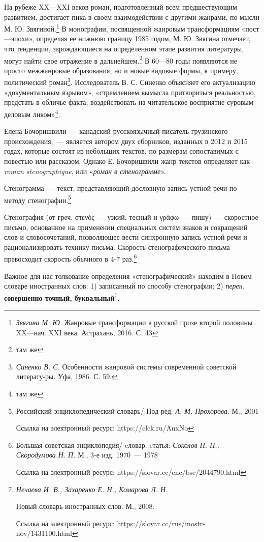 \documentclass{kursa4}
\begin{document}
    На рубеже XX—XXI веков роман, подготовленный всем предшествующим развитием, достигает пика в своем взаимодействии с другими жанрами, по мысли М. Ю. Звягиной.\footnote{\textit{Звягина М. Ю.} Жанровые трансформации в русской прозе второй половины XX—нач. XXI века. Астрахань, 2016. С. 43} 
    В монографии, посвященной жанровым трансформациям «пост—эпохи», определяя ее нижнюю границу 1985 годом, М. Ю. Звягина отмечает, что тенденции, зарождающиеся на определенном этапе развития литературы, могут найти свое отражение в дальнейшем.\footnote{там же}  В 60—80 годы появляются не просто межжанровые образования, но и новые видовые формы, к примеру, политический роман\footnote{\textit{Синенко В. С.} Особенности жанровой системы современной советской литерату-ры. Уфа, 1986.  С. 59.}. Исследователь В. С. Синенко объясняет его актуализацию «документальным взрывом», «стремлением вымысла притвориться реальностью, предстать в обличье факта, воздействовать на читательское восприятие суровым деловым ликом»\footnote{там же}. 

    Елена Бочоришвили~--- канадский русскоязычный писатель грузинского происхождения,~--- является автором двух сборников, изданных в 2012 и 2015 годах, которые состоят из небольших текстов, по размерам сопоставимых с повестью или рассказом. Однако Е. Бочоришвили жанр текстов определяет как \textit{roman stenographique}, или «\textit{роман в стенограмме}». 

    {Стенограмма~--- текст, представляющий дословную запись устной речи по методу стенографии.}\footnote{{Российский энциклопедический словарь/ Под ред. \textit{А. М. Прохорова}. М., 2001 }\par
    {Ссылка на электронный ресурс:
    https://clck.ru/AuxNo}}

    {Стенография}\textbf{{ }}(от греч. στενός~--- узкий, тесный и γράφω~--- пишу)~--- скоростное письмо, основанное на применении специальных систем знаков и сокращений слов и словосочетаний, позволяющее вести синхронную запись устной речи и рационализировать технику письма. Скорость стенографического письма превосходит скорость обычного в 4-7 раз.\footnote{{Большая советская энциклопедия/ cловар. cтатья: \textit{Соколов Н. Н., Скородумова Н. П.} М., 3-е изд. 1970~--- 1978}\par{Ссылка на электронный ресурс: https://slovar.cc/enc/bse/2044790.html}}

    Важное для нас толкование определения «стенографический» находим в Новом словаре иностранных слов{: }1) записанный по способу стенографии; 2) \textit{перен.} \textbf{совершенно точный, буквальный}\footnote{\textit{{Нечаева И. В., Захаренко Е. Н., Комарова Л. Н. }}{Новый словарь иностранных слов. М., 2008. 

    Ссылка на электронный ресурс: https://slovar.cc/rus/inostr-nov/1431100.html}}. 
\end{document}
